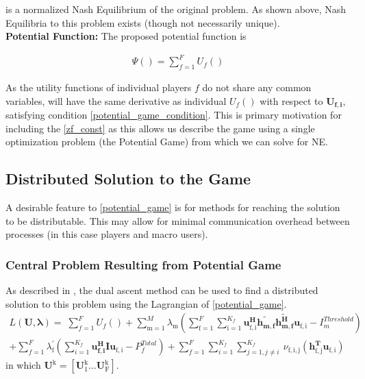 \documentclass[12pt]{article}
\newtheorem{theorem}{Theorem}
\begin{document}
is a normalized Nash Equilibrium of the original problem.
As shown above, Nash Equilibria to this problem exists (though not necessarily unique). 
\\
\textbf{Potential Function:} The proposed potential function is 

\begin{gather*} \label{Potential_Function}
\Psi() = \sum_{f = 1}^{F} U_f() 
\end{gather*}


As the utility functions of individual players $f$ do not share any common variables,  \label{Potential_Function} will have the same derivative as individual $U_f()$ with respect to $\mathbf{U_{f,i}} $, satisfying condition \eqref{potential_game_condition}. This is primary motivation for including the  \eqref{zf_const} as this allows us describe the game using a single optimization problem (the Potential Game) from which we can solve for NE. 


\subsection{Distributed Solution to the Game}
A desirable feature to \eqref{potential_game} is for methods for reaching the solution to be distributable. This may allow for minimal communication overhead between processes (in this case players and macro users).
\subsubsection{Central Problem Resulting from Potential Game}
As described in \cite[p.~8,9]{boyd2011distributed}, the dual ascent method can be used to find a distributed solution to this problem using the Lagrangian of \eqref{potential_game}. 
\\
\begin{multline}
L(\mathbf{U,\lambda}) = 
\;
\sum_{f=1}^F U_f() 
+
\sum_{\mathrm{m=1}}^M \lambda_{\mathrm{m}}
(\sum_{\mathrm{f=1}}^F
\sum_{\mathrm{i=1}}^{K_f}
\mathbf{u_{ \mathrm{f,i}}^H} \mathbf{\tilde{h_{m,f}}} \mathbf{\tilde{h_{m,f}^H}} \mathbf{u_{\mathrm{f,i}}} - I^{Threshold}_{m} )
\\
+ 
\sum_{f=1}^F
\lambda_{\mathrm{f}}^{'}(
\sum_{i=1}^{K_f}\mathbf{u_{f,i}^H} \mathbf{I} \mathbf{u_{\mathrm{f,i}}} -  P^{Total}_{f})
+
\sum_{f=1}^F
\sum_{i=1}^{K_f}
\sum_{j=1, j\neq i}^{K_f}
\
\nu_{\mathrm{f,i,j}}(\mathbf{h^T_{\mathrm{f,j}}}\mathbf{u_{\mathrm{f,i}}})
\end{multline}
in which $\mathbf{U^{\mathrm{k}}} = [\mathbf{U^{\mathrm{k}}_{\mathrm{1}}}...\mathbf{U^{\mathrm{k}}_{\mathrm{F}}}]$.
\end{document}
